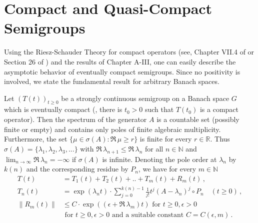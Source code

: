 \section{Compact and Quasi-Compact Semigroups}

Using the Riesz-Schauder Theory for compact operators (see, \eg
Chapter VII.4 of \citet{dunfordschwartz:1958} or Section 26 of \citet{pietsch:1978}) and the results of Chapter A-III, one can easily describe the
asymptotic behavior of eventually compact semigroups.
Since no positivity is involved, we state the fundamental result for arbitrary Banach
spaces.

\begin{theorem}\label{thm:b4-2.1}
	Let $(T(t))_{t \geq 0}$ be a strongly continuous semigroup on a
	Banach space $G$ which is eventually compact (\ie, there is $t_{0} > 0$
	such that $T(t_{0})$ is a compact operator).
	Then the spectrum of the
	generator $A$ is a countable set (possibly finite or empty) and
	contains only poles of finite algebraic multiplicity.
	Furthermore,
	the set $\{\mu \in \sigma(A) \colon \Re\,\mu \geq r\}$ is finite for every $r \in \mathbb{R}$.
	Thus
	$\sigma(A) = \{\lambda_1,\lambda_2,\lambda_3,... \}$ with $\Re\,\lambda_{n+1} \leq \Re\,\lambda_n$ for all $n \in \mathbb{N}$ and
	$\lim_{n \to \infty} \Re\,\lambda_n = -\infty$ if $\sigma(A)$ is infinite.
	Denoting the pole order at $\lambda_n$ by $k(n)$ and the corresponding residue
	by $P_n$, we have for every $m \in \mathbb{N}$
	\begin{equation}\label{eq:b4-2.1}
		\begin{aligned}
			T(t) &= T_1(t) + T_2(t) + .. + T_m(t) + R_m(t)\,,\\
			T_n(t) &= \exp(\lambda_n t) \cdot \sum_{j=0}^{k(n)-1} \frac{1}{j!}t^j(A - \lambda_n)^j \circ P_n \quad (t \geq 0)\,,\\
			\|R_m(t)\| & \leq C \cdot \exp((\epsilon +\Re\, \lambda_m)t) \text{ for }  t \geq 0, \epsilon >0\\
			&  \text{ for }  t \geq 0, \epsilon >0  \text{ and a suitable	constant } C=C(\epsilon ,m)\,.
		\end{aligned}
	\end{equation}
\end{theorem}

